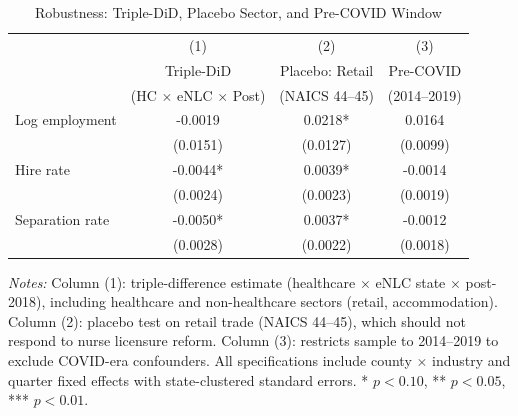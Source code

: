 
\begin{table}[H]
\centering
\caption{Robustness: Triple-DiD, Placebo Sector, and Pre-COVID Window}
\label{tab:robustness}
\begin{threeparttable}
\begin{tabular}{lccc}
\toprule
& (1) & (2) & (3) \\
& Triple-DiD & Placebo: Retail & Pre-COVID \\
& (HC $\times$ eNLC $\times$ Post) & (NAICS 44--45) & (2014--2019) \\
\midrule
Log employment & -0.0019 & 0.0218* & 0.0164 \\
 & (0.0151) & (0.0127) & (0.0099) \\
[0.5em]
Hire rate & -0.0044* & 0.0039* & -0.0014 \\
 & (0.0024) & (0.0023) & (0.0019) \\
[0.5em]
Separation rate & -0.0050* & 0.0037* & -0.0012 \\
 & (0.0028) & (0.0022) & (0.0018) \\

\bottomrule
\end{tabular}
\begin{tablenotes}[flushleft]
\small
\item \textit{Notes:} Column (1): triple-difference estimate (healthcare $\times$ eNLC state $\times$ post-2018), including healthcare and non-healthcare sectors (retail, accommodation). Column (2): placebo test on retail trade (NAICS 44--45), which should not respond to nurse licensure reform. Column (3): restricts sample to 2014--2019 to exclude COVID-era confounders. All specifications include county $\times$ industry and quarter fixed effects with state-clustered standard errors. * $p<0.10$, ** $p<0.05$, *** $p<0.01$.
\end{tablenotes}
\end{threeparttable}
\end{table}

